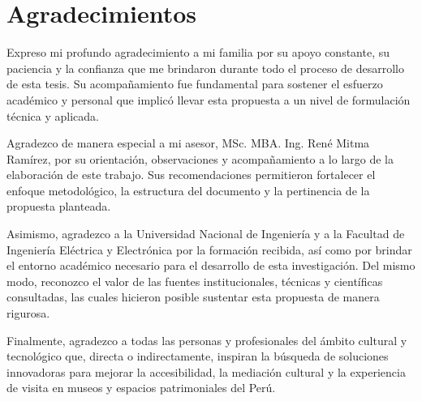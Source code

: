\chapter*{Agradecimientos}

Expreso mi profundo agradecimiento a mi familia por su apoyo constante, su paciencia y la confianza que me brindaron durante todo el proceso de desarrollo de esta tesis. Su acompañamiento fue fundamental para sostener el esfuerzo académico y personal que implicó llevar esta propuesta a un nivel de formulación técnica y aplicada.

Agradezco de manera especial a mi asesor, MSc. MBA. Ing. René Mitma Ramírez, por su orientación, observaciones y acompañamiento a lo largo de la elaboración de este trabajo. Sus recomendaciones permitieron fortalecer el enfoque metodológico, la estructura del documento y la pertinencia de la propuesta planteada.

Asimismo, agradezco a la Universidad Nacional de Ingeniería y a la Facultad de Ingeniería Eléctrica y Electrónica por la formación recibida, así como por brindar el entorno académico necesario para el desarrollo de esta investigación. Del mismo modo, reconozco el valor de las fuentes institucionales, técnicas y científicas consultadas, las cuales hicieron posible sustentar esta propuesta de manera rigurosa.

Finalmente, agradezco a todas las personas y profesionales del ámbito cultural y tecnológico que, directa o indirectamente, inspiran la búsqueda de soluciones innovadoras para mejorar la accesibilidad, la mediación cultural y la experiencia de visita en museos y espacios patrimoniales del Perú.
